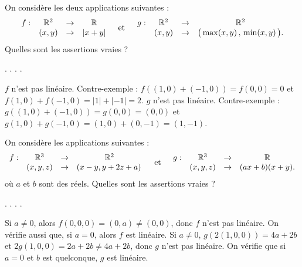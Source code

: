 \begin{question}
On considère les deux applications suivantes : 
$$\begin{array}{rccc}f:&\mathbb{R}^2&\to&\mathbb{R}\\
& (x,y)&\to & |x+y| \end{array} \quad \mbox{et} \quad \begin{array}{rccc}g:&\mathbb{R}^2&\to&\mathbb{R}^2\\
& (x,y)&\to &\big(\max (x,y)\, , \, \min (x,y)\, \big). \end{array}$$ 
Quelles sont les assertions vraies ?
\begin{answers}  
.
.
.
.
\end{answers}
\begin{explanations} $f$ n'est pas linéaire. Contre-exemple : $f((1,0)+(-1,0))=f(0,0)=0$ et $f(1,0)+f(-1,0)=|1|+|-1|=2$.
\vskip0mm
$g$ n'est pas linéaire. Contre-exemple :  $g((1,0)+(-1,0))=g(0,0)=(0,0)$ 
et $g(1,0)+g(-1,0)=(1,0)+(0,-1)=(1,-1)$.
\end{explanations}
\end{question}

\begin{question}
On considère les applications suivantes : 
$$\begin{array}{rccc}f:&\mathbb{R}^3&\to&\mathbb{R}^2\\
& (x,y,z)&\to &(x-y,y+2z+a) \,  \end{array}  \quad \mbox{et} \quad  \begin{array}{rccc}g:&\mathbb{R}^3&\to&\mathbb{R}\\
& (x,y,z)&\to &(ax+b)(x+y).\end{array} $$ 
où $a$ et $b$  sont des réels. Quelles sont les assertions vraies ?
\begin{answers}  
.
.
.
.
\end{answers}
\begin{explanations} Si $a\neq 0$, alors $f(0,0,0)=(0,a)\neq(0,0)$, donc $f$ n'est pas linéaire. On vérifie aussi que, si $a=0$, alors $f$ est linéaire.
\vskip0mm
Si $a\neq 0$, $g(2(1,0,0))=4a+2b$ et $2g(1,0,0)=2a+2b \neq 4a+2b$, donc $g$ n'est pas linéaire.
\vskip0mm
On vérifie que si $a=0$ et $b$ est quelconque, $g$ est linéaire.
\end{explanations}
\end{question}

